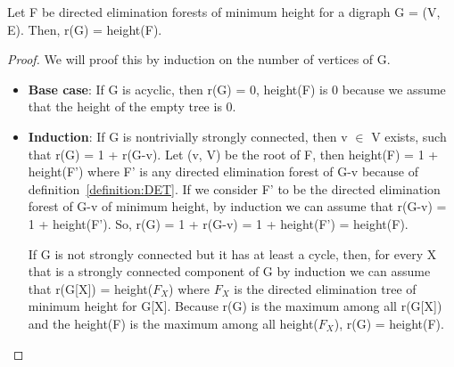\begin{lemma}
Let F be directed elimination forests of minimum height for a digraph G = (V, E). Then, r(G) = height(F). 
\end{lemma}
\begin{proof}
We will proof this by induction on the number of vertices of G.
\begin{itemize}
  \item \textbf{Base case}: If G is acyclic, then r(G) = 0, height(F) is 0 because we assume that the height of the empty tree is 0.
  \item \textbf{Induction}: If G is nontrivially strongly connected, then v $\in$ V exists, such that r(G) = 1 + r(G-v). Let (v, V) be the root of F, then height(F) = 1 + height(F') where F' is any directed elimination forest of G-v because of definition~\ref{definition:DET}. If we consider F' to be the directed elimination forest of G-v of minimum height, by induction we can assume that r(G-v) = 1 + height(F'). So, r(G) = 1 + r(G-v) = 1 + height(F') = height(F).
  
  If G is not strongly connected but it has at least a cycle, then, for every X that is a strongly connected component of G by induction we can assume that r(G[X]) = height($F_X$) where $F_X$ is the directed elimination tree of minimum height for G[X]. Because r(G) is the maximum among all r(G[X]) and the height(F) is the maximum among all height($F_X$), r(G) = height(F).
\end{itemize}
\end{proof}